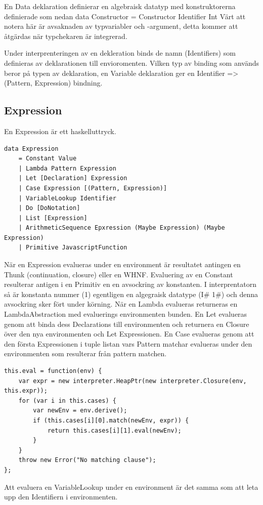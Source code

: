 En Data deklaration definierar en algebraisk datatyp med konstruktorerna definierade som nedan
data Constructor = Constructor Identifier Int
Värt att notera här är avsaknaden av typvariabler och -argument, detta kommer att åtgärdas när typchekaren är integrerad.

Under interprenteringen av en dekleration binds de namn (Identifiers) som definieras av deklarationen till envioromenten. Vilken typ av binding som används beror på typen av deklaration, en Variable deklaration ger en Identifier => (Pattern, Expression) bindning.

\subsection{Expression}
En Expression är ett haskelluttryck.

\begin{lstlisting}
data Expression 
    = Constant Value
    | Lambda Pattern Expression
    | Let [Declaration] Expression
    | Case Expression [(Pattern, Expression)]
    | VariableLookup Identifier
    | Do [DoNotation]
    | List [Expression]
    | ArithmeticSequence Epxression (Maybe Expression) (Maybe Expression)
    | Primitive JavascriptFunction
\end{lstlisting}

När en Expression evalueras under en environment är resultatet antingen en Thunk (continuation, closure) eller en WHNF. Evaluering av en Constant resulterar antigen i en Primitiv en en avsockring av konstanten. I interprentatorn så är konstanta nummer (1) egentligen en algegraisk datatype (I\# 1\#) och denna avsockring sker fört under körning. När en Lambda evalueras returneras en LambdaAbstraction med evaluerings environmenten bunden. En Let evalueras genom att binda dess Declarations till environmenten och returnera en Closure över den nya environmenten och Let Expressionen. En Case evalueras genom att den första Expressionen i tuple listan vars Pattern matchar evalueras under den environmenten som resulterar från pattern matchen.
\begin{lstlisting}
this.eval = function(env) {
    var expr = new interpreter.HeapPtr(new interpreter.Closure(env, this.expr));
    for (var i in this.cases) {
        var newEnv = env.derive();
        if (this.cases[i][0].match(newEnv, expr)) {
            return this.cases[i][1].eval(newEnv);
        }
    }
    throw new Error("No matching clause");
};
\end{lstlisting}
Att evaluera en VariableLookup under en environment är det samma som att leta upp den Identifiern i environmenten.


